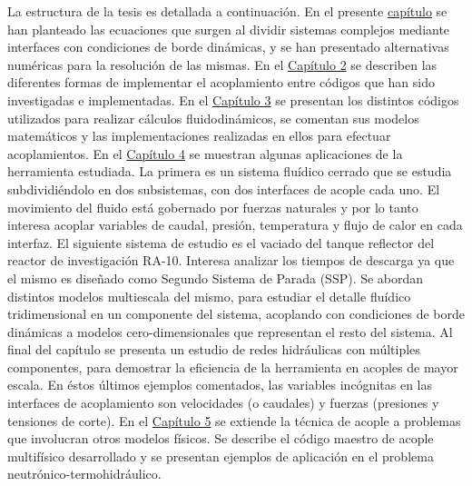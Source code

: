 La estructura de la tesis es detallada a continuación.
En el presente \hyperlink{chapter.1}{capítulo} se han planteado las ecuaciones que surgen al dividir sistemas complejos mediante interfaces con condiciones de borde dinámicas,
y se han presentado alternativas numéricas para la resolución de las mismas.
En el \hyperlink{chapter.2}{Capítulo 2} se describen las diferentes formas de implementar el acoplamiento entre códigos que han sido investigadas e implementadas.
En el \hyperlink{chapter.3}{Capítulo 3} se presentan los distintos códigos utilizados para realizar cálculos fluidodinámicos,
se comentan sus modelos matemáticos y las implementaciones realizadas en ellos para efectuar acoplamientos.
En el \hyperlink{chapter.4}{Capítulo 4} se muestran algunas aplicaciones de la herramienta estudiada.
La primera es un sistema fluídico cerrado que se estudia subdividiéndolo en dos subsistemas, con dos interfaces de acople cada uno.
El movimiento del fluido está gobernado por fuerzas naturales y por lo tanto interesa acoplar variables de 
caudal, presión, temperatura y flujo de calor en cada interfaz.
El siguiente sistema de estudio es el vaciado del tanque reflector del reactor de investigación RA-10.
Interesa analizar los tiempos de descarga ya que el mismo es diseñado como Segundo Sistema de Parada (SSP).
Se abordan distintos modelos multiescala del mismo, para estudiar el detalle fluídico tridimensional en un componente del sistema,
acoplando con condiciones de borde dinámicas a modelos cero-dimensionales que representan el resto del sistema.
Al final del capítulo se presenta un estudio de redes hidráulicas con múltiples componentes,
para demostrar la eficiencia de la herramienta en acoples de mayor escala.
En éstos últimos ejemplos comentados, las variables incógnitas en las interfaces de acoplamiento son velocidades (o caudales) y fuerzas (presiones y tensiones de corte).
En el \hyperlink{chapter.5}{Capítulo 5} se extiende la técnica de acople a problemas que involucran otros modelos físicos.
Se describe el código maestro de acople multifísico desarrollado y se presentan ejemplos de aplicación en el problema neutrónico-termohidráulico.

